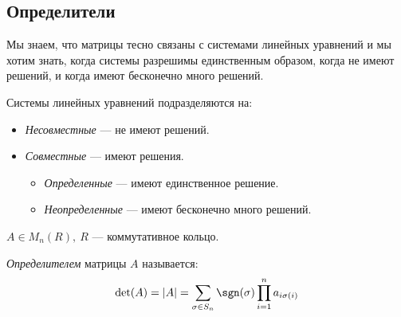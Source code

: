 \subsection{Определители}

Мы знаем, что матрицы тесно связаны с системами линейных уравнений и мы хотим знать, когда системы разрешимы единственным образом, когда не имеют решений, и когда имеют бесконечно много решений.

\begin{defn}
    Системы линейных уравнений подразделяются на:

    \begin{itemize}
        \item \emph{Несовместные} --- не имеют решений.
        \item \emph{Совместные} --- имеют решения.
        \begin{itemize}
            \item \emph{Определенные} --- имеют единственное решение.
            \item \emph{Неопределенные} --- имеют бесконечно много решений.
        \end{itemize}
    \end{itemize}
\end{defn}

\begin{defn}
    $A \in M_n(R),~ R$ --- коммутативное кольцо. 
    
    \emph{Определителем} матрицы $A$ называется: 
    $$\det(A) = |A| = \sum\limits_{\sigma \in S_n} \sgn(\sigma)\prod\limits_{i = 1}^n a_{i\sigma(i)}$$
\end{defn}


